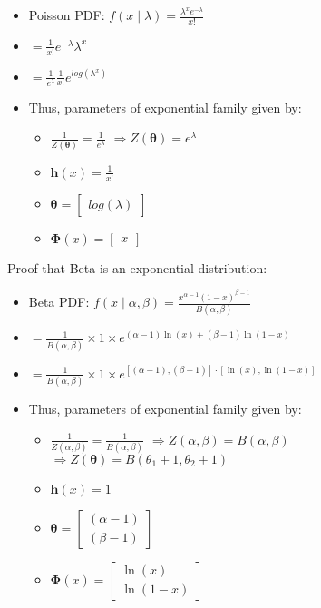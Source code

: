\begin{itemize}
    \item Poisson PDF:
    $
    f(x \mid \lambda) = \frac{\lambda^x e^{-\lambda}}{x!}
    $
    \item $
    = \frac{1}{x!}e^{-\lambda} \lambda^x
    $
    \item $
    = \frac{1}{e^\lambda}\frac{1}{x!} e^{log(\lambda^x)}
    $
    \item Thus, parameters of exponential family given by:
    \begin{itemize}
        \item $\frac{1}{Z(\boldsymbol{\theta})} = \frac{1}{e^\lambda}$
        $ \Rightarrow
        Z(\boldsymbol{\theta}) = e^\lambda
        $
        \item $\boldsymbol{h}(x) = \frac{1}{x!}$
        \item $\boldsymbol{\theta} = \begin{bmatrix}
        log(\lambda)
        \end{bmatrix}$
        \item $
        \boldsymbol{\Phi}(x) = \begin{bmatrix}
        x
        \end{bmatrix}
        $
    \end{itemize}
\end{itemize}
Proof that Beta is an exponential distribution:
\begin{itemize}
    \item Beta PDF: $
    f(x \mid \alpha, \beta) = \frac{x^{\alpha - 1} (1 - x)^{\beta - 1}}{B(\alpha, \beta)}
    $
    \item 
    $
    = \frac{1}{B(\alpha, \beta)} \times 1 \times  e^{(\alpha - 1) \ln(x) + (\beta - 1) \ln(1 - x)}
    $
    \item 
    $
    = \frac{1}{B(\alpha, \beta)} \times 1 \times  e^{[(\alpha - 1),(\beta - 1)] \cdot [\ln(x), \ln(1 - x)]}
    $
    \item Thus, parameters of exponential family given by:
    \begin{itemize}
        \item $\frac{1}{Z(\alpha, \beta)} = \frac{1}{B(\alpha, \beta)}$
        $ \Rightarrow
        Z(\alpha, \beta) = B(\alpha, \beta)
        $
        $ \Rightarrow
        Z(\boldsymbol{\theta}) = B(\theta_1 + 1, \theta_2 + 1)
        $
        \item $\boldsymbol{h}(x) = 1$
        \item $\boldsymbol{\theta} = \begin{bmatrix}
        (\alpha - 1)\\
        (\beta - 1)
        \end{bmatrix}$
        \item $
        \boldsymbol{\Phi}(x) = \begin{bmatrix}
        \ln(x)\\
        \ln(1-x)
        \end{bmatrix}
        $
    \end{itemize}
\end{itemize}
